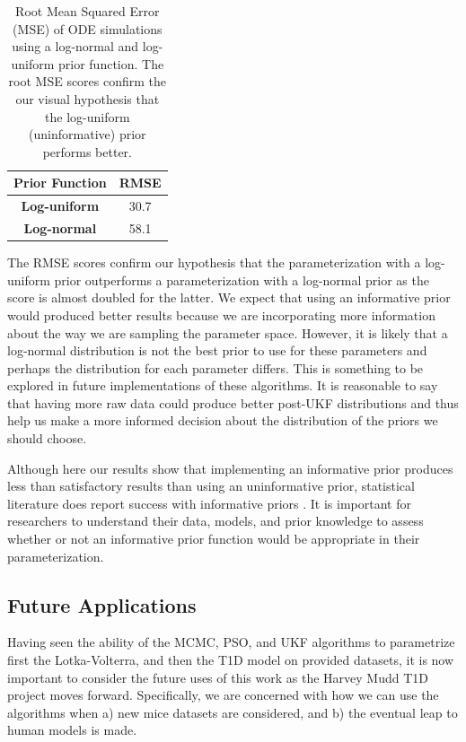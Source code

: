 \begin{table}[H]
  \begin{center}
    \begin{tabular}{c|c} 
      \textbf{Prior Function} & \textbf{RMSE} \\
      \hline
      \textbf{Log-uniform} & 30.7\\
      \textbf{Log-normal} & 58.1\\
    \end{tabular}
    \caption{Root Mean Squared Error (MSE) of ODE simulations using a log-normal and log-uniform prior function. The root MSE scores confirm the our visual hypothesis that the log-uniform (uninformative) prior performs better.}
  \end{center}
  \label{tab:1disc}
\end{table}
The RMSE scores confirm our hypothesis that the parameterization with a log-uniform prior outperforms a parameterization with a log-normal prior as the score is almost doubled for the latter. We expect that using an informative prior would produced better results because we are incorporating more information about the way we are sampling the parameter space. However, it is likely that a log-normal distribution is not the best prior to use for these parameters and perhaps the distribution for each parameter differs. This is something to be explored in future implementations of these algorithms. It is reasonable to say that having more raw data could produce better post-UKF distributions and thus help us make a more informed decision about the distribution of the priors we should choose.
\par Although here our results show that implementing an informative prior produces less than satisfactory results than using an uninformative prior, statistical literature does report success with informative priors \cite{golchi_priors}. It is important for researchers to understand their data, models, and prior knowledge to assess whether or not an informative prior function would be appropriate in their parameterization.


\subsection{Future Applications}
Having seen the ability of the MCMC, PSO, and UKF algorithms to parametrize first the Lotka-Volterra, and then the T1D model on provided datasets, it is now important to consider the future uses of this work as the Harvey Mudd T1D project moves forward. Specifically, we are concerned with how we can use the algorithms when a) new mice datasets are considered, and b) the eventual leap to human models is made.

